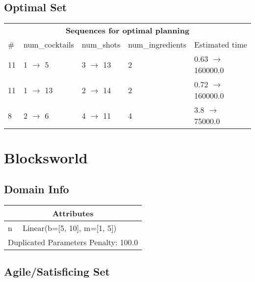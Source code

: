 \documentclass{article}
\begin{document}
                            \subsection*{Optimal Set}

                            \begin{center}
                            \begin{tabular}{l|l|l|l|l}
                            \multicolumn{5}{c}{\bf \large Sequences for optimal planning}\\
                            \# & num\_cocktails & num\_shots & num\_ingredients & Estimated time\\\midrule
                            11&1 $\rightarrow$ 5&3 $\rightarrow$ 13&2&0.63 $\rightarrow$ 160000.0\\
11&1 $\rightarrow$ 13&2 $\rightarrow$ 14&2&0.72 $\rightarrow$ 160000.0\\
8&2 $\rightarrow$ 6&4 $\rightarrow$ 11&4&3.8 $\rightarrow$ 75000.0
                            \end{tabular}
                            \end{center}
                    \newpage \section{Blocksworld}
                    \subsection*{Domain Info}

                    \begin{center}
                    \begin{tabular}{p{}p{}}
                    \multicolumn{2}{c}{\bf \large Attributes}\\\midrule
                    n & Linear(b=[5, 10], m=[1, 5])
                    
                     \\\midrule
                    \multicolumn{2}{l}{Duplicated Parameters Penalty: 100.0}
                    \end{tabular}
                    \end{center}
                
                         \subsection*{Agile/Satisficing Set}
\end{document}
